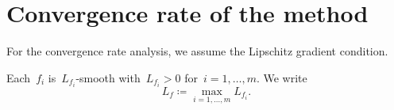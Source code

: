 \documentclass[../../main]{subfiles}
\begin{document}
\section{Convergence rate of the method} 
For the convergence rate analysis, we assume the Lipschitz gradient condition.
\begin{assumption} 
    Each~$f_i$ is~$L_{f_i}$-smooth with~$L_{f_i} > 0$ for~$i = 1, \dots, m$.
    We write
    \begin{equation} \label{eq:pgm_Lipschitz_constant}
        L_f \coloneqq \max_{i = 1, \dots, m} L_{f_i}
        .\end{equation}
\end{assumption}
\end{document}
